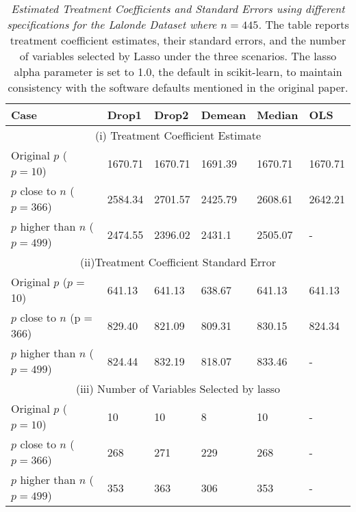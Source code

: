 \begin{table}[h!]
\renewcommand{\arraystretch}{1.5}
\centering
\begin{tabular}{||l l l l l l||} 
 \hline
 \hline
 Case & Drop1 & Drop2 & Demean & Median & OLS \\ [0.5ex] 
 \hline \hline
 \multicolumn{6}{||c||}{(i) Treatment Coefficient Estimate} \\ [0.5ex]
 Original $p$ ($p = 10$) & 1670.71 & 1670.71 & 1691.39 & 1670.71 & 1670.71 \\ 
 $p$ close to $n$ ($p = 366$) & 2584.34 & 2701.57 & 2425.79 & 2608.61 & 2642.21 \\
 $p$ higher than $n$ ($p= 499$) & 2474.55 & 2396.02 & 2431.1 & 2505.07 & - \\ [1ex] 
 \hline
 \multicolumn{6}{||c||}{(ii)Treatment Coefficient Standard Error} \\ [0.5ex]
 Original $p$ ($p$ = 10) & 641.13 & 641.13 & 638.67 & 641.13 & 641.13 \\ 
 $p$ close to $n$ (p = 366) & 829.40 & 821.09 & 809.31 & 830.15 & 824.34 \\
 $p$ higher than $n$ ($p= 499$)  & 824.44 & 832.19 & 818.07 & 833.46 & - \\ [1ex] 
 \hline
 \multicolumn{6}{||c||}{(iii) Number of Variables Selected by lasso} \\ [0.5ex]
 Original $p$ ($p = 10$) & 10 & 10 & 8 & 10 & - \\ 
 $p$ close to $n$ ($p = 366$) & 268 & 271 & 229 & 268 & - \\
 $p$ higher than $n$ ($p= 499$) & 353 & 363 & 306 & 353 & - \\ [1ex] 
 \hline \hline
\end{tabular}
\caption{\textit{Estimated Treatment Coefficients and Standard Errors using different specifications for the Lalonde Dataset where $n = 445$.} The table reports treatment coefficient estimates, their standard errors, and the number of variables selected by Lasso under the three scenarios. The lasso alpha parameter is set to 1.0, the default in scikit-learn, to maintain consistency with the software defaults mentioned in the original paper. }
\label{table:1}
\end{table}


